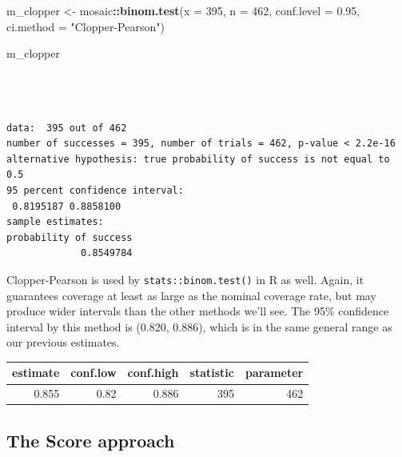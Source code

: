 \documentclass[
]{book}
\newenvironment{Shaded}{\begin{snugshade}}{\end{snugshade}}
\newcommand{\DataTypeTok}[1]{\textcolor[rgb]{0.13,0.29,0.53}{#1}}
\newcommand{\DecValTok}[1]{\textcolor[rgb]{0.00,0.00,0.81}{#1}}
\newcommand{\FloatTok}[1]{\textcolor[rgb]{0.00,0.00,0.81}{#1}}
\newcommand{\KeywordTok}[1]{\textcolor[rgb]{0.13,0.29,0.53}{\textbf{#1}}}
\newcommand{\NormalTok}[1]{#1}
\newcommand{\OperatorTok}[1]{\textcolor[rgb]{0.81,0.36,0.00}{\textbf{#1}}}
\newcommand{\StringTok}[1]{\textcolor[rgb]{0.31,0.60,0.02}{#1}}
\begin{document}
\begin{Shaded}
\begin{Highlighting}[]
\NormalTok{m_clopper <-}\StringTok{ }\NormalTok{mosaic}\OperatorTok{::}\KeywordTok{binom.test}\NormalTok{(}\DataTypeTok{x =} \DecValTok{395}\NormalTok{, }\DataTypeTok{n =} \DecValTok{462}\NormalTok{,}
                                \DataTypeTok{conf.level =} \FloatTok{0.95}\NormalTok{,}
                                \DataTypeTok{ci.method =} \StringTok{"Clopper-Pearson"}\NormalTok{)}

\NormalTok{m_clopper}
\end{Highlighting}
\end{Shaded}

\begin{verbatim}



data:  395 out of 462
number of successes = 395, number of trials = 462, p-value < 2.2e-16
alternative hypothesis: true probability of success is not equal to 0.5
95 percent confidence interval:
 0.8195187 0.8858100
sample estimates:
probability of success 
             0.8549784 
\end{verbatim}

Clopper-Pearson is used by \texttt{stats::binom.test()} in R as well. Again, it guarantees coverage at least as large as the nominal coverage rate, but may produce wider intervals than the other methods we'll see. The 95\% confidence interval by this method is (0.820, 0.886), which is in the same general range as our previous estimates.

\begin{Shaded}
\end{Shaded}

\begin{tabular}{r|r|r|r|r}
\hline
estimate & conf.low & conf.high & statistic & parameter\\
\hline
0.855 & 0.82 & 0.886 & 395 & 462\\
\hline
\end{tabular}

\hypertarget{the-score-approach}{%
\subsection{The Score approach}\label{the-score-approach}}
\end{document}
